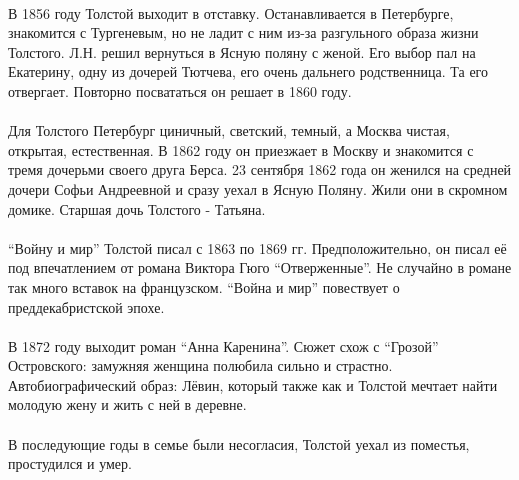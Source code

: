 \documentclass{article}
\begin{document}
\paragraph{}

В 1856 году Толстой выходит в отставку. Останавливается в Петербурге, знакомится с Тургеневым, но не ладит с ним
из-за разгульного образа жизни Толстого. Л.Н. решил вернуться в Ясную поляну с женой.
Его выбор пал на Екатерину, одну из дочерей Тютчева, его очень дальнего родственница. Та его отвергает.
Повторно посвататься он решает в 1860 году.

\paragraph{}

Для Толстого Петербург циничный, светский, темный, а Москва чистая, открытая, естественная. В 1862 году он
приезжает в Москву и знакомится с тремя дочерьми своего друга Берса. 23 сентября 1862 года он женился на средней
дочери Софьи Андреевной и сразу уехал в Ясную Поляну. Жили они в скромном домике. Старшая дочь Толстого -
Татьяна.

\paragraph{}

``Войну и мир'' Толстой писал с 1863 по 1869 гг. Предположительно, он писал её под впечатлением от романа
Виктора Гюго ``Отверженные''. Не случайно в романе так много вставок на французском. ``Война и мир'' повествует
о преддекабристской эпохе.

\paragraph{}

В 1872 году выходит роман ``Анна Каренина''. Сюжет схож с ``Грозой'' Островского: замужняя женщина
полюбила сильно и страстно. Автобиографический образ: Лёвин, который также как и Толстой мечтает найти молодую
жену и жить с ней в деревне.

\paragraph{}

В последующие годы в семье были несогласия, Толстой уехал из поместья, простудился и умер.

\end{document}
